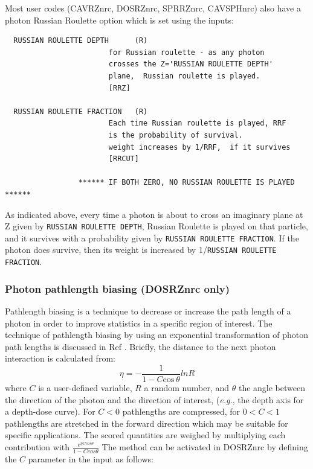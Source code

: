 \documentclass[12pt,twoside]{article}  %
\begin{document}
Most user codes (CAVRZnrc, DOSRZnrc, SPRRZnrc, CAVSPHnrc) 
also have a photon Russian Roulette option which is
set using the inputs:

\begin{verbatim}
  RUSSIAN ROULETTE DEPTH      (R)
                        for Russian roulette - as any photon 
                        crosses the Z='RUSSIAN ROULETTE DEPTH'
                        plane,  Russian roulette is played.
                        [RRZ]

  RUSSIAN ROULETTE FRACTION   (R)
                        Each time Russian roulette is played, RRF 
                        is the probability of survival.
                        weight increases by 1/RRF,  if it survives
                        [RRCUT]

                 ****** IF BOTH ZERO, NO RUSSIAN ROULETTE IS PLAYED ****** 
\end{verbatim}

As indicated above, every time a photon is about to cross an imaginary
plane 
at Z given by {\tt RUSSIAN ROULETTE DEPTH}, Russian Roulette is
played on that particle, and it survives with a probability given
by {\tt RUSSIAN ROULETTE FRACTION}.  If the photon does survive, then
its weight is increased by 1/{\tt RUSSIAN ROULETTE FRACTION}. 

\subsubsection{Photon pathlength biasing (DOSRZnrc only)}

Pathlength biasing is a technique to decrease or increase 
the path length of a photon in order to improve statistics in 
a specific region of interest. The technique of pathlength 
biasing by using an exponential transformation of photon path
lengths is discussed in Ref \cite{RB90}. Briefly, the distance to
the next photon interaction is calculated from:
\begin{equation}
\eta = - \frac{1}{1 - C \mbox{cos}~ \theta} ln R
\end{equation}
where $C$ is a user-defined variable, $R$ a random number, and $\theta$
the angle between the direction of the photon and the direction of
interest, ({\em e.g.}, the depth axis for a depth-dose curve).
For $C < 0$ pathlengths are compressed, for $0 < C < 1$ pathlengths
are stretched in the forward direction which may be suitable for 
specific applications. The scored quantities are weighed by
multiplying each contribution with 
$\frac{e^{\eta C cos \theta}}{1 - C cos \theta}$
The method can be
activated in DOSRZnrc
by defining the $C$ parameter in the input as follows:
\end{document}
